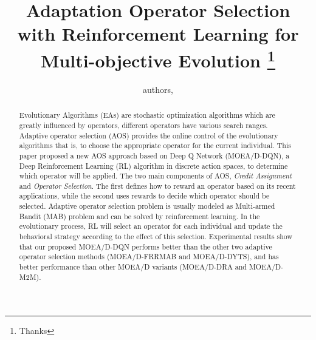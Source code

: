 \documentclass[journal]{IEEEtran}
\begin{document}
\title{{Adaptation Operator Selection with Reinforcement Learning for Multi-objective Evolution}
  \thanks{Thanks}}
\author{
  authors,
}%



\maketitle

\begin{abstract}
  Evolutionary Algorithms (EAs) are stochastic optimization algorithms which are greatly influenced by operators, different operators have various search ranges.
  Adaptive operator selection (AOS) provides the online control of the evolutionary algorithms that is, to choose the appropriate operator for the current individual.
  This paper proposed a new AOS approach based on Deep Q Network (MOEA/D-DQN), a Deep Reinforcement Learning (RL) algorithm in discrete action spaces, to determine which operator will be applied.
  The two main components of AOS, \textit{Credit Assignment} and \textit{Operator Selection}. The first defines how to reward an operator based on its recent applications, while the second uses rewards to decide which operator should be selected.
  Adaptive operator selection problem is usually modeled as Multi-armed Bandit (MAB) problem and can be solved by reinforcement learning.
  In the evolutionary process, RL will select an operator for each individual and update the behavioral strategy according to the effect of this selection.
  Experimental results show that our proposed MOEA/D-DQN performs better than the other two adaptive operator selection methods (MOEA/D-FRRMAB and MOEA/D-DYTS), and has better performance than other MOEA/D variants (MOEA/D-DRA and MOEA/D-M2M).
\end{abstract}
\end{document}
